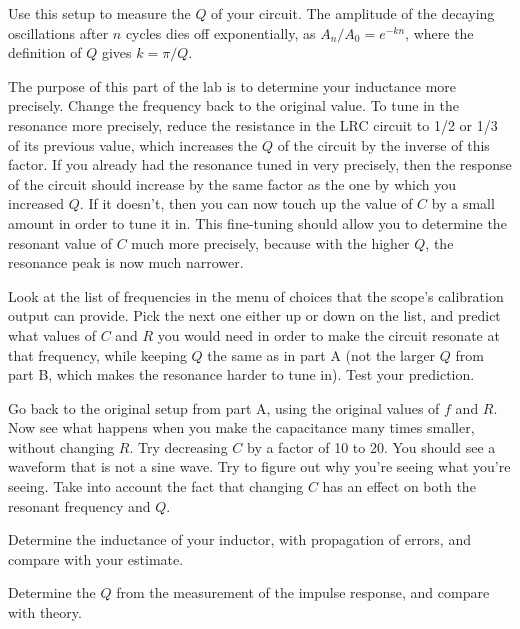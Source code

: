 
Use this setup to measure the $Q$ of your circuit. The amplitude of the decaying oscillations
after $n$ cycles dies off exponentially, as $A_n/A_0=e^{-kn}$, where the definition of $Q$
gives $k=\pi/Q$.


The purpose of this part of the lab is to determine your inductance more precisely.
Change the frequency back to the original value.
To tune in the resonance more precisely, reduce the resistance
in the LRC circuit to 1/2 or 1/3 of its previous value, which increases
the $Q$ of the circuit by the inverse of this factor. If you already had the resonance
tuned in very precisely, then the response of the circuit should increase by the
same factor as the one by which you increased $Q$. If it doesn't, then you can now
touch up the value of $C$ by a small amount in order to tune it in. This fine-tuning
should allow you to determine the resonant value of $C$ much more precisely, because
with the higher $Q$, the resonance peak is now much narrower.


Look at the list of frequencies in the menu of choices that the scope's calibration
output can provide. Pick the next one either up or down on the list, and predict what
values of $C$ and $R$ you would need in order to make the circuit resonate at that frequency,
while keeping $Q$ the same as in part A (not the larger $Q$ from part B, which makes the
resonance harder to tune in).
Test your prediction.


Go back to the original setup from part A, using the original values of $f$ and $R$.
Now see what happens when you make the
capacitance many times smaller, without changing $R$. Try decreasing $C$ by a factor of 10 to 20.
You should see a waveform that is not a sine wave. Try to figure out why
you're seeing what you're seeing. Take into account the fact that changing $C$
has an effect on both the resonant frequency and $Q$.


\analysis

Determine the inductance of your inductor, with propagation of errors, and compare
with your estimate.

Determine the $Q$ from the measurement of the impulse response, and compare with theory.
